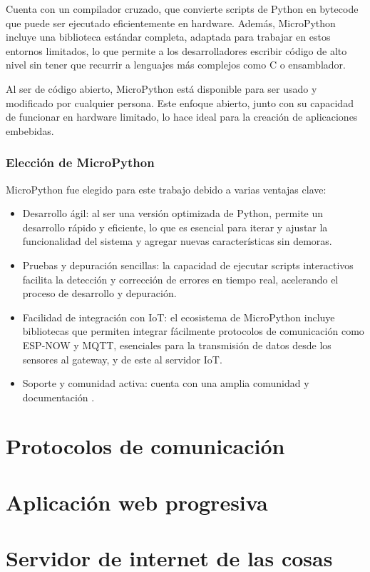 Cuenta con un compilador cruzado, que convierte scripts de Python en bytecode que puede ser ejecutado eficientemente en hardware. Además, MicroPython incluye una biblioteca estándar completa, adaptada para trabajar en estos entornos limitados, lo que permite a los desarrolladores escribir código de alto nivel sin tener que recurrir a lenguajes más complejos como C o ensamblador.

Al ser de código abierto, MicroPython está disponible para ser usado y modificado por cualquier persona. Este enfoque abierto, junto con su capacidad de funcionar en hardware limitado, lo hace ideal para la creación de aplicaciones embebidas. \citep{micropython} \citep{infoMpy}

\subsubsection{Elección de MicroPython}
MicroPython fue elegido para este trabajo debido a varias ventajas clave:

\begin{itemize}
    \item Desarrollo ágil: al ser una versión optimizada de Python, permite un desarrollo rápido y eficiente, lo que es esencial para iterar y ajustar la funcionalidad del sistema y agregar nuevas características sin demoras.
    \item Pruebas y depuración sencillas: la capacidad de ejecutar scripts interactivos facilita la detección y corrección de errores en tiempo real, acelerando el proceso de desarrollo y depuración.
    \item Facilidad de integración con IoT: el ecosistema de MicroPython incluye bibliotecas que permiten integrar fácilmente protocolos de comunicación como ESP-NOW y MQTT, esenciales para la transmisión de datos  desde los sensores al gateway, y de este al servidor IoT.
    \item Soporte y comunidad activa: cuenta con una amplia comunidad y documentación \citep{docsmpy}.
\end{itemize}

\section{Protocolos de comunicación}

\section{Aplicación web progresiva}


\section{Servidor de internet de las cosas}





